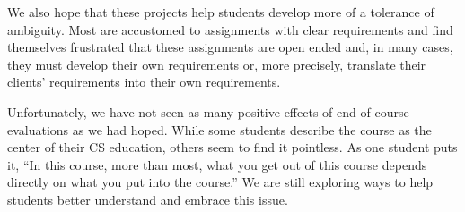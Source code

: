 We also hope that these projects help students develop more of a
tolerance of ambiguity.  Most are accustomed to assignments with
clear requirements and find themselves frustrated that these 
assignments are open ended and, in many cases, they must develop
their own requirements or, more precisely, translate their clients'
requirements into their own requirements.

Unfortunately, we have not seen as many positive effects of
end-of-course evaluations as we had hoped.  While some students
describe the course as the center of their CS education, others
seem to find it pointless.  As one student puts it, ``In this course,
more than most, what you get out of this course depends directly
on what you put into the course.''  We are still exploring ways to
help students better understand and embrace this issue.


